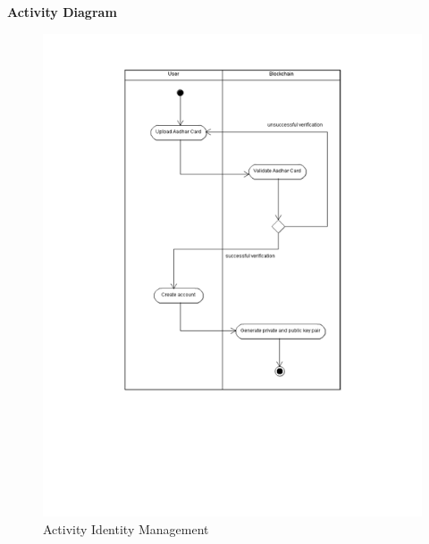 \clearpage
\textbf{Activity Diagram}
\begin{figure}[!h]
	\centering
	\includegraphics[width=\linewidth]{Images/UML/ActivityIdentityManagement.png}
	\caption{ Activity Identity Management}
\end{figure}
